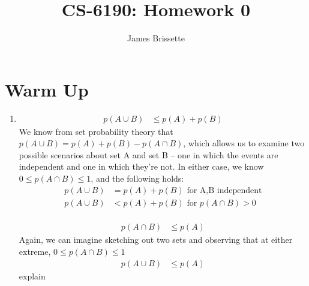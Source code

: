 \documentclass[11pt,a4paper]{article}
\author{James Brissette}
\title{CS-6190: Homework 0}
\begin{document}
	\maketitle
	
	\section{Warm Up}
		\begin{enumerate}
			\item
			\begin{align*}
				p(A \cup B) &\leq p(A) + p(B)
			\end{align*}
			We know from set probability theory that $p(A \cup B) = p(A) + p(B) - p(A \cap B)$, which allows us to examine two possible scenarios about set A and set B -- one in which the events are independent and one in which they're not. In either case, we know $0 \leq p(A \cap B) \leq 1$, and the following holds:
			\begin{align*} 
				p(A \cup B) &= p(A) + p(B) \text{ for A,B independent} \\
				p(A \cup B) &< p(A) + p(B) \text{ for $p(A \cap B) > 0$}
			\end{align*}
			\\
			\begin{align*}
				p(A \cap B) &\leq p(A)
			\end{align*}
			Again, we can imagine sketching out two sets and observing that at either extreme, $0 \leq p(A \cap B) \leq 1$
			\begin{align*}
				p(A \cup B) &\leq p(A)
			\end{align*}
			explain
		

\end{enumerate}
\end{document}
